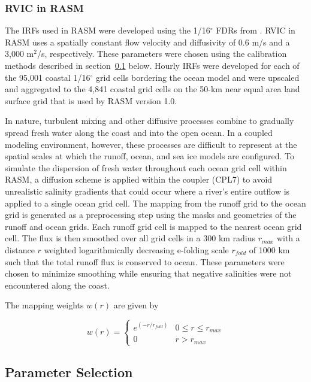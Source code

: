 \documentclass[jgrga, draft]{agutex}
\begin{document}
\begin{article}
\subsubsection{RVIC in RASM}

The IRFs used in RASM were developed using the 1/16$^{\circ}$ FDRs from \citet{Wu_2011}.
RVIC in RASM uses a spatially constant flow velocity and diffusivity of 0.6 m/s and a 3,000 m$^2$/s, respectively.
These parameters were chosen using the calibration methods described in section~\ref{sec:parameters} below.
Hourly IRFs were developed for each of the 95,001 coastal 1/16$^{\circ}$ grid cells bordering the ocean model and were upscaled and aggregated to the 4,841 coastal grid cells on the 50-km near equal area land surface grid that is used by RASM version 1.0.

In nature, turbulent mixing and other diffusive processes combine to gradually spread fresh water along the coast and into the open ocean.
In a coupled modeling environment, however, these processes are difficult to represent at the spatial scales at which the runoff, ocean, and sea ice models are configured.
To simulate the dispersion of fresh water throughout each ocean grid cell within RASM, a diffusion scheme is applied within the coupler (CPL7) to avoid unrealistic salinity gradients that could occur where a river's entire outflow is applied to a single ocean grid cell.
The mapping from the runoff grid to the ocean grid is generated as a preprocessing step using the masks and geometries of the runoff and ocean grids.
Each runoff grid cell is mapped to the nearest ocean grid cell.
The flux is then smoothed over all grid cells in a 300 km radius $r_{max}$ with a distance $r$ weighted logarithmically decreasing e-folding scale $r_{fold}$ of 1000 km such that the total runoff flux is conserved to ocean.
These parameters were chosen to minimize smoothing while ensuring that negative salinities were not encountered along the coast.

The mapping weights $w(r)$ are given by

\begin{equation}
  \label{eq:diffusion}
  w(r)=
     \begin{cases}
        e^{(-r/r_{fold})} & 0\leq r\leq r_{max} \\
        0 & r > r_{max}
     \end{cases}
\end{equation}

\subsection{Parameter Selection}
\label{sec:parameters}


\end{article}
\end{document}
